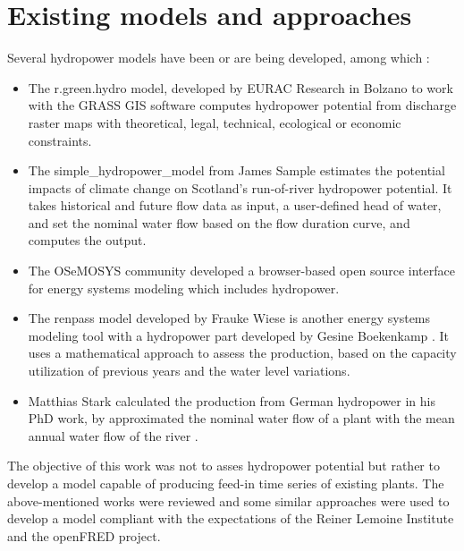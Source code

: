 \section{Existing models and approaches}

Several hydropower models have been or are being developed, among which : 
\begin{itemize}
 \item The r.green.hydro model, developed by EURAC Research in Bolzano \cite{grass} to work with the GRASS GIS software computes hydropower potential from discharge raster maps with theoretical, legal, technical, ecological or economic constraints.
 \item The simple{\_}hydropower{\_}model from James Sample \cite{sample} estimates the potential impacts of climate change on Scotland's run-of-river hydropower potential. It takes historical and future flow data as input, a user-defined head of water, and set the nominal water flow based on the flow duration curve, and computes the output.
 \item The OSeMOSYS community \cite{osemosys} developed a browser-based open source interface for energy systems modeling which includes hydropower.
 \item The renpass model \cite{wiese} developed by Frauke Wiese is another energy systems modeling tool with a hydropower part developed by Gesine Boekenkamp \cite{gesine}. It uses a mathematical approach to assess the production, based on the capacity utilization of previous years and the water level variations.
 \item Matthias Stark calculated the production from German hydropower in his PhD work, by approximated the nominal water flow of a plant with the mean annual water flow of the river \cite{stark}.
\end{itemize}
The objective of this work was not to asses hydropower potential but rather to develop a model capable of producing feed-in time series of existing plants. The above-mentioned works were reviewed and some similar approaches were used to develop a model compliant with the expectations of the Reiner Lemoine Institute and the openFRED project.